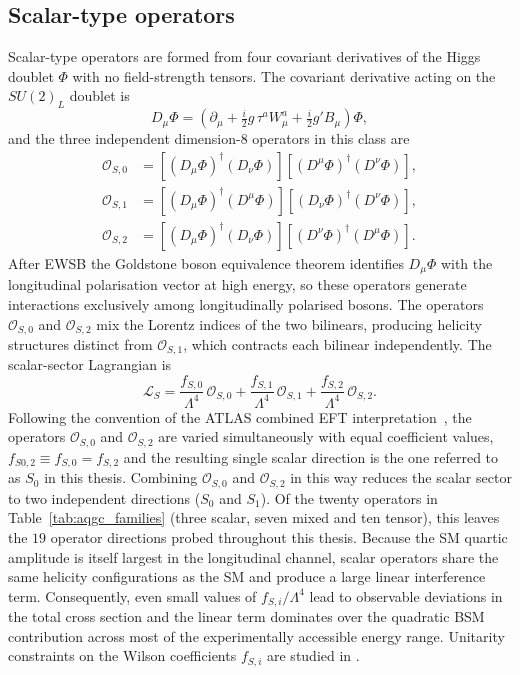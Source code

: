 \subsection{Scalar-type operators}

Scalar-type operators are formed from four covariant derivatives of the Higgs doublet $\Phi$ with no field-strength tensors. The covariant derivative acting on the $SU(2)_L$ doublet is
\begin{equation}
D_{\mu}\Phi = \left(\partial_{\mu} + \tfrac{i}{2}g\,\tau^{a}W_{\mu}^{a} + \tfrac{i}{2}g'B_{\mu}\right)\Phi,
\end{equation}
and the three independent dimension-8 operators in this class are \cite{Eboli_2016}
\begin{align}
\mathcal{O}_{S,0} &= \left[(D_{\mu}\Phi)^{\dagger}(D_{\nu}\Phi)\right] \left[(D^{\mu}\Phi)^{\dagger}(D^{\nu}\Phi)\right], \\[4pt] \mathcal{O}_{S,1} &= \left[(D_{\mu}\Phi)^{\dagger}(D^{\mu}\Phi)\right] \left[(D_{\nu}\Phi)^{\dagger}(D^{\nu}\Phi)\right], \\[4pt] \mathcal{O}_{S,2} &= \left[(D_{\mu}\Phi)^{\dagger}(D_{\nu}\Phi)\right] \left[(D^{\nu}\Phi)^{\dagger}(D^{\mu}\Phi)\right].
\end{align}
After EWSB the Goldstone boson equivalence theorem identifies $D_\mu\Phi$ with the longitudinal polarisation vector at high energy, so these operators generate interactions exclusively among longitudinally polarised bosons. The operators $\mathcal{O}_{S,0}$ and $\mathcal{O}_{S,2}$ mix the Lorentz indices of the two bilinears, producing helicity structures distinct from $\mathcal{O}_{S,1}$, which contracts each bilinear independently. The scalar-sector Lagrangian is
\begin{equation}
\mathcal{L}_{S} = \frac{f_{S,0}}{\Lambda^{4}}\,\mathcal{O}_{S,0} + \frac{f_{S,1}}{\Lambda^{4}}\,\mathcal{O}_{S,1} + \frac{f_{S,2}}{\Lambda^{4}}\,\mathcal{O}_{S,2}.
\end{equation}
Following the convention of the ATLAS combined EFT interpretation~\cite{ATLAS:VBStribosoncombination:2026}, the operators $\mathcal{O}_{S,0}$ and $\mathcal{O}_{S,2}$ are varied simultaneously with equal coefficient values, $f_{S0,2}\equiv f_{S,0}=f_{S,2}$ and the resulting single scalar direction is the one referred to as $S_0$ in this thesis. Combining $\mathcal{O}_{S,0}$ and $\mathcal{O}_{S,2}$ in this way reduces the scalar sector to two independent directions ($S_0$ and $S_1$). Of the twenty operators in Table~\ref{tab:aqgc_families} (three scalar, seven mixed and ten tensor), this leaves the $19$ operator directions probed throughout this thesis. Because the SM quartic amplitude is itself largest in the longitudinal channel, scalar operators share the same helicity configurations as the SM and produce a large linear interference term. Consequently, even small values of $f_{S,i}/\Lambda^4$ lead to observable deviations in the total cross section and the linear term dominates over the quadratic BSM contribution across most of the experimentally accessible energy range. Unitarity constraints on the Wilson coefficients $f_{S,i}$ are studied in \cite{PhysRevD.101.113003}.

